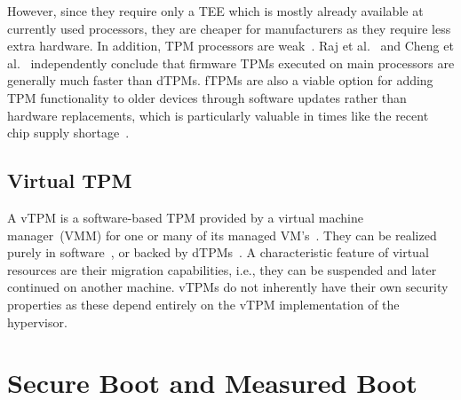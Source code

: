 
However, since they require only a \ac{TEE} which is mostly already available at currently used processors, they are cheaper for manufacturers as they require less extra hardware.
In addition, TPM processors are weak~\cite{Goh2013, Raj2015}.
Raj et al.~\cite{Raj2015} and Cheng et al.~\cite{Cheng2020} independently conclude that firmware TPMs executed on main processors are generally much faster than \acp{dTPM}.
\Acp{fTPM} are also a viable option for adding \ac{TPM} functionality to older devices through software updates rather than hardware replacements, which is particularly valuable in times like the recent chip supply shortage~\cite{Voas2021, casper2021}.




\subsection{Virtual TPM}

A vTPM is a software-based TPM provided by a virtual machine manager~(VMM) for one or many of its managed VM's~\cite{268868}.
They can be realized purely in software~\cite{268868}, or backed by dTPMs~\cite{Liu2010}.
A characteristic feature of virtual resources are their migration capabilities, i.e., they can be suspended and later continued on another machine.
vTPMs do not inherently have their own security properties as these depend entirely on the vTPM implementation of the hypervisor.


\section{Secure Boot and Measured Boot}

